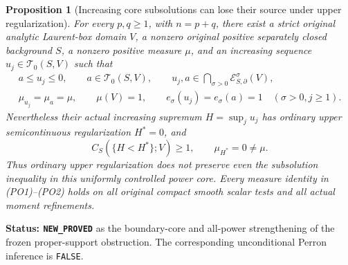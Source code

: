 \documentclass[11pt,a4paper]{article}
\numberwithin{equation}{section}
\newtheorem{proposition}[theorem]{Proposition}
\theoremstyle{definition}
\theoremstyle{remark}
\begin{document}
\begin{proposition}[Increasing core subsolutions can lose their source under upper regularization]
\label{prop:r11-power-core-envelope-obstruction}
For every $p,q\geq1$, with $n=p+q$, there exist a strict original analytic
Laurent-box domain $V$, a nonzero original positive separately
closed background $S$, a nonzero positive measure $\mu$, and
an increasing sequence $u_j\in\mathscr T_0(S,V)$ such that
\[
 \begin{gathered}
     a\leq u_j\leq0,\qquad
     a\in\mathscr T_0(S,V),\qquad
     u_j,a\in\bigcap_{\sigma>0}\mathcal E^\sigma_{S,\partial}(V),\\
     \mu_{u_j}=\mu_a=\mu,\qquad
     \mu(V)=1,\qquad
     e_\sigma(u_j)=e_\sigma(a)=1
                  \quad(\sigma>0, j\geq1).
 \end{gathered}
 \tag{PO1}
\]
Nevertheless their actual increasing supremum $H=\sup_j u_j$
has ordinary upper semicontinuous regularization $H^*=0$, and
\[
          C_S(\{H<H^*\};V)\geq1,
          \qquad \mu_{H^*}=0\ne\mu.
 \tag{PO2}
\]
Thus ordinary upper regularization does not preserve even the
subsolution inequality in this uniformly controlled power core.
Every measure identity in (PO1)--(PO2) holds on all original
compact smooth scalar tests and all actual moment refinements.
\end{proposition}

\noindent\textbf{Status: \texttt{NEW\_PROVED}} as the
boundary-core and all-power strengthening of the frozen proper-support
obstruction. The corresponding unconditional Perron inference is
\texttt{FALSE}.
\end{document}
